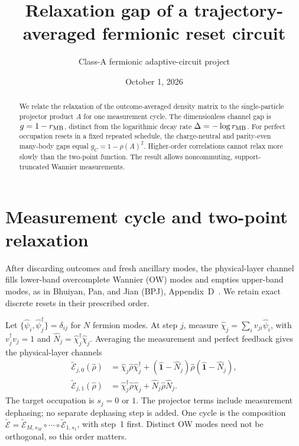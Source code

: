 \documentclass[aps,prb,twocolumn,10pt,raggedbottom,nofootinbib,superscriptaddress]{revtex4-2}
\newcommand{\Id}{\hat{\mathbf{1}}}
\newcommand{\E}{\widetilde{\mathcal E}}
\begin{document}
\title{Relaxation gap of a trajectory-averaged fermionic reset circuit}
\author{Class-A fermionic adaptive-circuit project}
\noaffiliation
\date{October 1, 2026}
\begin{abstract}
We relate the relaxation of the outcome-averaged density matrix to the
single-particle projector product $A$ for one measurement cycle. The
dimensionless channel gap is $g=1-r_{\rm MB}$, distinct from the
logarithmic decay rate $\Delta=-\log r_{\rm MB}$. For perfect occupation
resets in a fixed repeated schedule, the charge-neutral and parity-even
many-body gaps equal $g_C=1-\rho(A)^2$. Higher-order correlations cannot
relax more slowly than the two-point function. The result allows
noncommuting, support-truncated Wannier measurements.
\end{abstract}
\maketitle
\setcounter{tocdepth}{1}
\tableofcontents

\section{Measurement cycle and two-point relaxation}
After discarding outcomes and fresh ancillary modes, the physical-layer
channel fills lower-band overcomplete Wannier (OW) modes and empties
upper-band modes, as in Bhuiyan, Pan, and Jian (BPJ), Appendix~D~\cite{BPJ}.
We retain exact discrete resets in their prescribed order.

Let $\{\hat\psi_i,\hat\psi_j^\dagger\}=\delta_{ij}$ for $N$ fermion
modes. At step $j$, measure $\hat\chi_j=\sum_i v_{ji}\hat\psi_i$,
with $v_j^\dagger v_j=1$ and
$\hat N_j=\hat\chi_j^\dagger\hat\chi_j$. Averaging the measurement
and perfect feedback gives the physical-layer channels
\begin{align}
 \E_{j,0}(\hat\rho)&=\hat\chi_j\hat\rho\hat\chi_j^\dagger
 +(\Id-\hat N_j)\hat\rho(\Id-\hat N_j),\nonumber\\
 \E_{j,1}(\hat\rho)&=\hat\chi_j^\dagger\hat\rho\hat\chi_j
 +\hat N_j\hat\rho\hat N_j. \label{eq:reset}
\end{align}
The target occupation is $s_j=0$ or $1$. The projector terms include
measurement dephasing; no separate dephasing step is added. One cycle
is the composition $\E=\E_{M,s_M}\circ\cdots\circ\E_{1,s_1}$,
with step~1 first. Distinct OW modes need not be orthogonal, so this
order matters.
\end{document}
